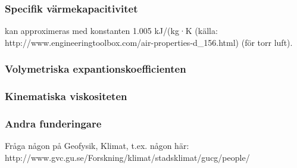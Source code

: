 \subsubsection{Specifik värmekapacitivitet}
kan approximeras med konstanten 1.005 kJ/(kg·K (källa: http://www.engineeringtoolbox.com/air-properties-d\_156.html) (för torr luft).

\subsubsection{Volymetriska expantionskoefficienten}

\subsubsection{Kinematiska viskositeten}

\subsubsection{Andra funderingare}
Fråga någon på Geofysik, Klimat, t.ex. någon här: http://www.gvc.gu.se/Forskning/klimat/stadsklimat/gucg/people/



